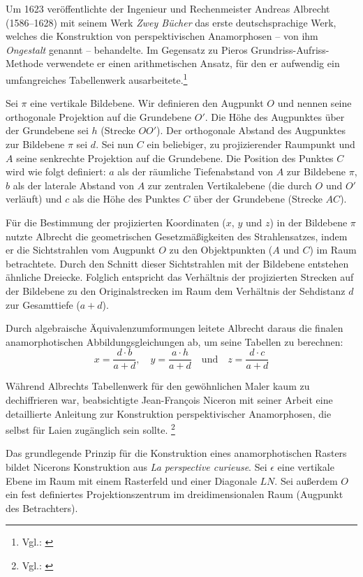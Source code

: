Um 1623 veröffentlichte der Ingenieur und Rechenmeister Andreas Albrecht (1586--1628) mit seinem Werk \textit{Zwey Bücher} das erste deutschsprachige Werk, welches die Konstruktion von perspektivischen Anamorphosen -- von ihm \textit{Ongestalt} genannt -- behandelte. Im Gegensatz zu Pieros Grundriss-Aufriss-Methode verwendete er einen arithmetischen Ansatz, für den er aufwendig ein umfangreiches Tabellenwerk ausarbeitete.\footnote{Vgl.: \cite[S. 605-606]{Andersen2007}}

Sei $\pi$ eine vertikale Bildebene. Wir definieren den Augpunkt $O$ und nennen seine orthogonale Projektion auf die Grundebene $O'$. Die Höhe des Augpunktes über der Grundebene sei $h$ (Strecke $OO'$). Der orthogonale Abstand des Augpunktes zur Bildebene $\pi$ sei $d$. Sei nun $C$ ein beliebiger, zu projizierender Raumpunkt und $A$ seine senkrechte Projektion auf die Grundebene. Die Position des Punktes $C$ wird wie folgt definiert: $a$ als der räumliche Tiefenabstand von $A$ zur Bildebene $\pi$, $b$ als der laterale Abstand von $A$ zur zentralen Vertikalebene (die durch $O$ und $O'$ verläuft) und $c$ als die Höhe des Punktes $C$ über der Grundebene (Strecke $AC$). 

Für die Bestimmung der projizierten Koordinaten ($x$, $y$ und $z$) in der Bildebene $\pi$ nutzte Albrecht die geometrischen Gesetzmäßigkeiten des Strahlensatzes, indem er die Sichtstrahlen vom Augpunkt $O$ zu den Objektpunkten ($A$ und $C$) im Raum betrachtete. Durch den Schnitt dieser Sichtstrahlen mit der Bildebene entstehen ähnliche Dreiecke. Folglich entspricht das Verhältnis der projizierten Strecken auf der Bildebene zu den Originalstrecken im Raum dem Verhältnis der Sehdistanz $d$ zur Gesamttiefe ($a+d$).

Durch algebraische Äquivalenzumformungen leitete Albrecht daraus die finalen anamorphotischen Abbildungsgleichungen ab, um seine Tabellen zu berechnen: 
$$x = \frac{d \cdot b}{a+d}, \quad y = \frac{a \cdot h}{a+d} \quad \text{und} \quad z = \frac{d \cdot c}{a+d}$$

Während Albrechts Tabellenwerk für den gewöhnlichen Maler kaum zu dechiffrieren war, beabsichtigte Jean-François Niceron mit seiner Arbeit eine detaillierte Anleitung zur Konstruktion perspektivischer Anamorphosen, die selbst für Laien zugänglich sein sollte. \footnote{Vgl.: \cite[S. 452]{Andersen2007}} 

Das grundlegende Prinzip für die Konstruktion eines anamorphotischen Rasters bildet Nicerons Konstruktion aus \textit{La perspective curieuse}. 
Sei $\epsilon$ eine vertikale Ebene im Raum mit einem Rasterfeld und einer Diagonale $LN$. Sei außerdem $O$ ein fest definiertes Projektionszentrum im dreidimensionalen Raum (Augpunkt des Betrachters). 

